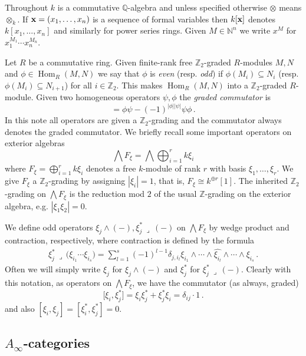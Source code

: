 \documentclass[english,letter paper,12pt,leqno]{article}
\theoremstyle{example}
\numberwithin{equation}{section}
\def\Hom{\operatorname{Hom}}
\def\be{\begin{equation}}
\def\ee{\end{equation}}
\def\nZ{\mathds{Z}}
\begin{document}
Throughout $k$ is a commutative $\mathbb{Q}$-algebra and unless specified otherwise $\otimes$ means $\otimes_k$. If $\bold{x} = (x_1,\ldots,x_n)$ is a sequence of formal variables then $k[\bold{x}]$ denotes $k[x_1,\ldots,x_n]$ and similarly for power series rings. Given $M \in \mathbb{N}^n$ we write $x^M$ for $x_1^{M_1} \cdots x_n^{M_n}$. 

Let $R$ be a commutative ring. Given finite-rank free $\nZ_2$-graded $R$-modules $M, N$ and $\phi \in \Hom_R(M,N)$ we say that $\phi$ is \emph{even} (resp. \emph{odd}) if $\phi(M_i) \subseteq N_i$ (resp. $\phi(M_i) \subseteq N_{i+1}$) for all $i \in \nZ_2$. This makes $\Hom_R(M,N)$ into a $\nZ_2$-graded $R$-module. Given two homogeneous operators $\psi, \phi$ the \emph{graded commutator} is
\be
[\phi, \psi] = \phi \psi - (-1)^{|\phi||\psi|} \psi \phi\,.
\ee
In this note all operators are given a $\nZ_2$-grading and the commutator always denotes the graded commutator. We briefly recall some important operators on exterior algebras
\[
\bigwedge F_\xi = \bigwedge \bigoplus_{i=1}^r k \xi_i
\]
where $F_\xi = \bigoplus_{i=1}^r k \xi_i$ denotes a free $k$-module of rank $r$ with basis $\xi_1,\ldots,\xi_r$. We give $F_\xi$ a $\nZ_2$-grading by assigning $|\xi_i| = 1$, that is, $F_\xi \cong k^{\oplus r}[1]$. The inherited $\nZ_2$-grading on $\bigwedge F_\xi$ is the reduction mod $2$ of the usual $\nZ$-grading on the exterior algebra, e.g. $|\xi_1 \xi_2| = 0$.

We define odd operators $\xi_j \wedge (-), \xi_j^* \,\lrcorner\, (-)$ on $\bigwedge F_\xi$ by wedge product and contraction, respectively, where contraction is defined by the formula
\begin{align*}
\xi_j^* \,\lrcorner\, \Big( \xi_{i_1} \cdots \xi_{i_s} \Big) = \sum_{l=1}^s (-1)^{l-1} \delta_{j, i_l} \xi_{i_1} \wedge \cdots \wedge \widehat{ \xi_{i_l} } \wedge \cdots \wedge \xi_{i_s}\,.
\end{align*}
Often we will simply write $\xi_j$ for $\xi_j \wedge (-)$ and $\xi_j^*$ for $\xi_j^* \,\lrcorner\, (-)$. Clearly with this notation, as operators on $\bigwedge F_\xi$, we have the commutator (as always, graded)
\be\label{eq:wedge_contract_comm}
\big[ \xi_i, \xi_j^* \big] = \xi_i \xi_j^* + \xi_j^* \xi_i = \delta_{ij} \cdot 1\,.
\ee
and also $[ \xi_i, \xi_j ] = [\xi_i^*, \xi_j^*] = 0$.

\subsection{$A_\infty$-categories}\label{section:ainfcat}
\end{document}

